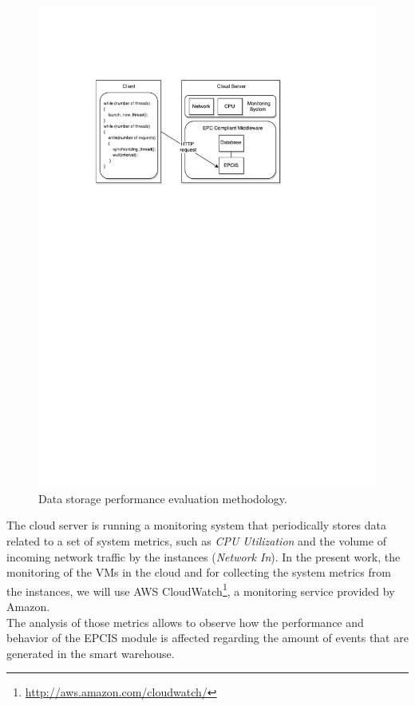 \begin{figure}[ht!]
  \centering
  \includegraphics[width=.9\textwidth]{./images/eval_data_methodology}
  \caption[Data storage evaluation methodology.]{Data storage performance evaluation methodology.}
  \label{fig:eval_data_methodology}
\end{figure}

The cloud server is running a monitoring system that periodically stores data related to a set of
system metrics, such as \textit{CPU Utilization} and the volume of incoming network traffic
by the instances (\textit{Network In}). In the present work, the monitoring of the \glspl{VM} in the
cloud and for collecting the system metrics from the instances, we will use \gls{AWS}
CloudWatch\footnote{\url{http://aws.amazon.com/cloudwatch/}}, a monitoring service provided by Amazon.\\

The analysis of those metrics allows to observe how the performance and behavior of the \gls{EPCIS}
module is affected regarding the amount of events that are generated in the smart warehouse.

